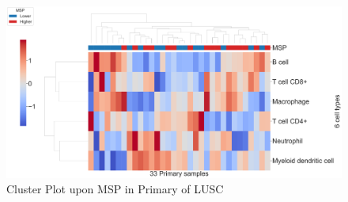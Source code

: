 \documentclass{beamer}
\begin{document}
\begin{frame}[allowframebreaks]
         \begin{figure}
            \includegraphics[width=0.9 \linewidth]{figures/TIMER/Clustermap/STAR.FPKM.SQC.MSP-median/Mutation Shared Proportion-TIMER-Primary.pdf}
            \caption{Cluster Plot upon MSP in Primary of LUSC}
        \end{figure}
    \end{frame}
\end{document}
